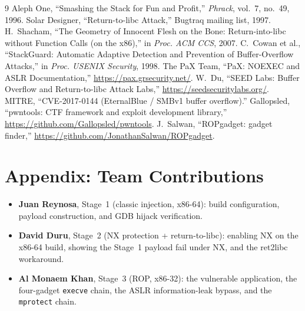 \documentclass[10pt,twocolumn,letterpaper]{article}
\newcommand{\code}[1]{\texttt{\small #1}}
\begin{document}
\begin{thebibliography}{9}
\small
{} Aleph One, ``Smashing the Stack for Fun and Profit,''
  \emph{Phrack}, vol.~7, no.~49, 1996.
 Solar Designer, ``Return-to-libc Attack,'' Bugtraq mailing
  list, 1997.
 H.~Shacham, ``The Geometry of Innocent Flesh on the Bone:
  Return-into-libc without Function Calls (on the x86),'' in \emph{Proc. ACM
  CCS}, 2007.
 C.~Cowan et al., ``StackGuard: Automatic Adaptive
  Detection and Prevention of Buffer-Overflow Attacks,'' in \emph{Proc. USENIX
  Security}, 1998.
 The PaX Team, ``PaX: NOEXEC and ASLR Documentation,''
  \url{https://pax.grsecurity.net/}.
 W.~Du, ``SEED Labs: Buffer Overflow and Return-to-libc Attack
  Labs,'' \url{https://seedsecuritylabs.org/}.
 MITRE, ``CVE-2017-0144 (EternalBlue / SMBv1 buffer overflow).''
 Gallopsled, ``pwntools: CTF framework and exploit
  development library,'' \url{https://github.com/Gallopsled/pwntools}.
 J.~Salwan, ``ROPgadget: gadget finder,''
  \url{https://github.com/JonathanSalwan/ROPgadget}.
\end{thebibliography}

\balance
\section*{Appendix: Team Contributions}
\begin{itemize}
  \item \textbf{Juan Reynosa}, Stage~1 (classic injection, x86-64): build
    configuration, payload construction, and GDB hijack verification.
  \item \textbf{David Duru}, Stage~2 (NX protection + return-to-libc):
    enabling NX on the x86-64 build, showing the Stage~1 payload fail under NX,
    and the ret2libc workaround.
  \item \textbf{Al Monaem Khan}, Stage~3 (ROP, x86-32): the vulnerable
    application, the four-gadget \code{execve} chain, the ASLR information-leak
    bypass, and the \code{mprotect} chain.
\end{itemize}
\end{document}
